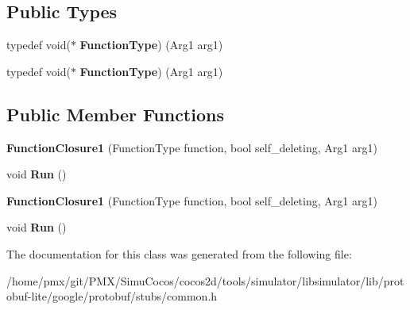 \subsection*{Public Types}
\begin{DoxyCompactItemize}
\item 
\mbox{\label{classgoogle_1_1protobuf_1_1internal_1_1FunctionClosure1_a344ea8ce357a462b835c6c96953f7358}} 
typedef void($\ast$ {\bfseries Function\+Type}) (Arg1 arg1)
\item 
\mbox{\label{classgoogle_1_1protobuf_1_1internal_1_1FunctionClosure1_a344ea8ce357a462b835c6c96953f7358}} 
typedef void($\ast$ {\bfseries Function\+Type}) (Arg1 arg1)
\end{DoxyCompactItemize}
\subsection*{Public Member Functions}
\begin{DoxyCompactItemize}
\item 
\mbox{\label{classgoogle_1_1protobuf_1_1internal_1_1FunctionClosure1_abea7f8d2d5fc091dadda6f4aad6cb4da}} 
{\bfseries Function\+Closure1} (Function\+Type function, bool self\+\_\+deleting, Arg1 arg1)
\item 
\mbox{\label{classgoogle_1_1protobuf_1_1internal_1_1FunctionClosure1_a57e8918773ca49b4bd72859921b6c6d7}} 
void {\bfseries Run} ()
\item 
\mbox{\label{classgoogle_1_1protobuf_1_1internal_1_1FunctionClosure1_abea7f8d2d5fc091dadda6f4aad6cb4da}} 
{\bfseries Function\+Closure1} (Function\+Type function, bool self\+\_\+deleting, Arg1 arg1)
\item 
\mbox{\label{classgoogle_1_1protobuf_1_1internal_1_1FunctionClosure1_a57e8918773ca49b4bd72859921b6c6d7}} 
void {\bfseries Run} ()
\end{DoxyCompactItemize}


The documentation for this class was generated from the following file\+:\begin{DoxyCompactItemize}
\item 
/home/pmx/git/\+P\+M\+X/\+Simu\+Cocos/cocos2d/tools/simulator/libsimulator/lib/protobuf-\/lite/google/protobuf/stubs/common.\+h\end{DoxyCompactItemize}
